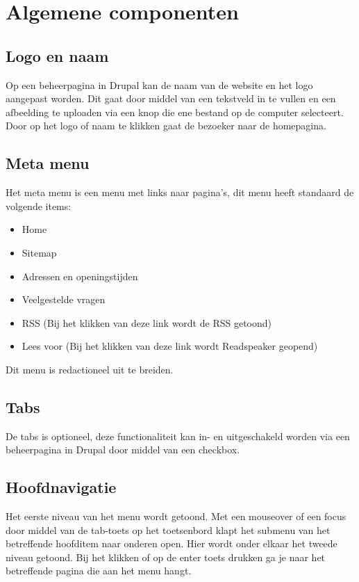 
\section{Algemene componenten}
\label{sec:algemenecomponenten}

\subsection{Logo en naam}
\label{sec:logoennaam}
Op een beheerpagina in Drupal kan de naam van de website en het logo aangepast worden. Dit gaat door middel van een tekstveld in te vullen en een afbeelding te uploaden via een knop die ene bestand op de computer selecteert. Door op het logo of naam te klikken gaat de bezoeker naar de homepagina.

\subsection{Meta menu}
\label{sec:metamenu}
Het meta menu is een menu met links naar pagina's, dit menu heeft standaard de volgende items:
\begin{itemize}
  \item Home
  \item Sitemap
  \item Adressen en openingstijden
  \item Veelgestelde vragen
  \item RSS (Bij het klikken van deze link wordt de RSS getoond)
  \item Lees voor (Bij het klikken van deze link wordt Readspeaker geopend)
\end{itemize}
Dit menu is redactioneel uit te breiden.

\subsection{Tabs}
\label{sec:tabspagina}
De tabs is optioneel, deze functionaliteit kan in- en uitgeschakeld worden via een beheerpagina in Drupal door middel van een checkbox. %

\subsection{Hoofdnavigatie}
\label{sec:hoofdnavigatie}
Het eerste niveau van het menu wordt getoond. Met een mouseover of een focus door middel van de tab-toets op het toetsenbord klapt het submenu van het betreffende hoofditem naar onderen open. Hier wordt onder elkaar het tweede niveau getoond. Bij het klikken of op de enter toets drukken ga je naar het betreffende pagina die aan het menu hangt.

